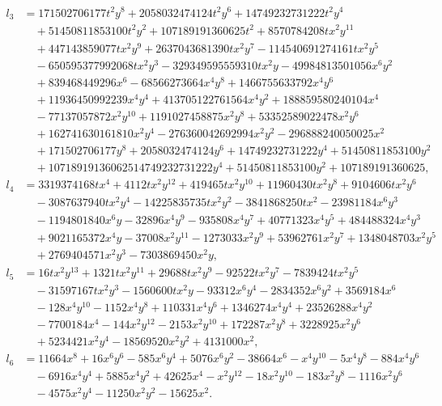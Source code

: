 \begin{align*}
l_3 &= 171502706177t^2y^8 + 2058032474124t^2y^6 + 14749232731222t^2y^4 \\
&\quad + 51450811853100t^2y^2 + 107189191360625t^2 + 8570784208tx^2y^{11} \\
&\quad + 447143859077tx^2y^9 + 2637043681390tx^2y^7 - 114540691274161tx^2y^5 \\
&\quad - 650595377992068tx^2y^3 - 329349595559310tx^2y - 49984813501056x^6y^2 \\
&\quad + 839468449296x^6 - 68566273664x^4y^8 + 1466755633792x^4y^6 \\
&\quad + 11936450992239x^4y^4 + 413705122761564x^4y^2 + 188859580240104x^4 \\
&\quad - 77137057872x^2y^{10} + 1191027458875x^2y^8 + 53352589022478x^2y^6 \\
&\quad + 162741630161810x^2y^4 - 276360042692994x^2y^2 - 296888240050025x^2 \\
&\quad + 171502706177y^8 + 2058032474124y^6 + 14749232731222y^4 + 51450811853100y^2 \\
&\quad + 10718919136062514749232731222y^4 + 51450811853100y^2 + 107189191360625,\\
l_4 &= 3319374168tx^4 + 4112tx^2y^{12} + 419465tx^2y^{10} + 11960430tx^2y^8 + 9104606tx^2y^6 \\
&\quad - 3087637940tx^2y^4 - 14225835735tx^2y^2 - 3841868250tx^2 - 23981184x^6y^3 \\
&\quad - 1194801840x^6y - 32896x^4y^9 - 935808x^4y^7 + 40771323x^4y^5 + 484488324x^4y^3 \\
&\quad + 9021165372x^4y - 37008x^2y^{11} - 1273033x^2y^9 + 53962761x^2y^7 + 1348048703x^2y^5 \\
&\quad + 2769404571x^2y^3 - 7303869450x^2y, \\
l_5 &= 16tx^2y^{13} + 1321tx^2y^{11} + 29688tx^2y^9 - 92522tx^2y^7 - 7839424tx^2y^5  \\
&\quad - 31597167tx^2y^3 - 1560600tx^2y - 93312x^6y^4 - 2834352x^6y^2 + 3569184x^6 \\
&\quad - 128x^4y^{10} - 1152x^4y^8 + 110331x^4y^6 + 1346274x^4y^4 + 23526288x^4y^2  \\
&\quad - 7700184x^4 - 144x^2y^{12} - 2153x^2y^{10} + 172287x^2y^8 + 3228925x^2y^6  \\
&\quad + 5234421x^2y^4 - 18569520x^2y^2 + 4131000x^2, \\
l_6 &= 11664x^8 + 16x^6y^6 - 585x^6y^4 + 5076x^6y^2 - 38664x^6 - x^4y^{10} - 5x^4y^8 - 884x^4y^6 \\
&\quad - 6916x^4y^4 + 5885x^4y^2 + 42625x^4 - x^2y^{12} - 18x^2y^{10} - 183x^2y^8 - 1116x^2y^6\\
&\quad - 4575x^2y^4 - 11250x^2y^2 - 15625x^2.\\
\end{align*}
